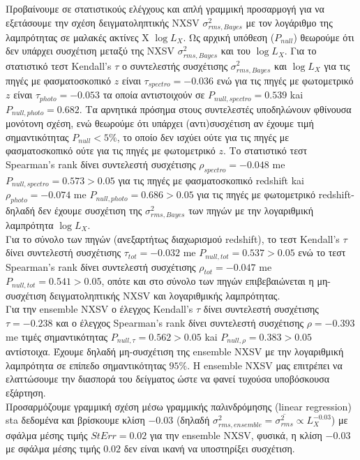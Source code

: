  
Προβαίνουμε σε στατιστικούς ελέγχους και απλή γραμμική προσαρμογή για να εξετάσουμε την σχέση δειγματοληπτικής \textlatin{NXSV} $\sigma_{rms, Bayes}^2$ με τον λογάριθμο της λαμπρότητας σε μαλακές ακτίνες Χ $\log L_X$. Ως αρχική υπόθεση ($P_{null}$) θεωρούμε ότι δεν υπάρχει συσχέτιση μεταξύ της \textlatin{NXSV} $\sigma_{rms, Bayes}^2$ και του $\log L_X$. Για το στατιστικό τεστ \textlatin{Kendall's} $\tau$ ο συντελεστής συσχέτισης $\sigma_{rms, Bayes}^2$ και $\log L_X$ για τις πηγές με φασματοσκοπικό $z$ είναι $\tau_{spectro} = -0.036$ ενώ για τις πηγές με φωτομετρικό $z$ είναι $\tau_{photo} = -0.053$ τα οποία αντιστοιχούν σε $P_{null, spectro} = 0.539$ kai $P_{null, photo} = 0.682$. Τα αρνητικά πρόσημα στους συντελεστές υποδηλώνουν φθίνουσα μονότονη σχέση, ενώ θεωρούμε ότι υπάρχει (αντι)συσχέτιση αν έχουμε τιμή σημαντικότητας $P_{null}<5\%$, το οποίο δεν ισχύει ούτε για τις πηγές με φασματοσκοπικό ούτε για τις πηγές με φωτομετρικό $z$. Το στατιστικό τεστ \textlatin{Spearman's rank} δίνει συντελεστή συσχέτισης $\rho_{spectro} = -0.048$ me $P_{null, spectro} = 0.573> 0.05$ για τις πηγές με φασματοσκοπικό \textlatin{redshift} kai $\rho_{photo} = -0.074$ me $P_{null, photo} = 0.686>0.05$ για τις πηγές με φωτομετρικό \textlatin{redshift}- δηλαδή δεν έχουμε συσχέτιση της $\sigma_{rms, Bayes}^2$ των πηγών με την λογαριθμική λαμπρότητα $\log L_X$. \\
Για το σύνολο των πηγών (ανεξαρτήτως διαχωρισμού \textlatin{redshift}), το τεστ \textlatin{Kendall's} $\tau$ δίνει συντελεστή συσχέτισης $\tau_{tot} = -0.032$ me $P_{null, tot}= 0.537 >0.05$ ενώ το τεστ \textlatin{Spearman's rank} δίνει συντελεστή συσχέτισης $\rho_{tot} =-0.047$ me $P_{null, tot} = 0.541>0.05$, οπότε και στο σύνολο των πηγών επιβεβαιώνεται η μη-συσχέτιση δειγματοληπτικής \textlatin{NXSV} και λογαριθμικής λαμπρότητας.\\
Για την \textlatin{ensemble NXSV} ο έλεγχος \textlatin{Kendall's} $\tau$ δίνει συντελεστή συσχέτισης $\tau = -0.238$ και ο έλεγχος \textlatin{Spearman's rank} δίνει συντελεστή συσχέτισης $\rho= -0.393$ me τιμές σημαντικότητας $P_{null, \tau} =0.562>0.05$ kai $P_{null, \rho} =0.383>0.05$ αντίστοιχα. Έχουμε δηλαδή μη-συσχέτιση της \textlatin{ensemble NXSV} με την λογαριθμική λαμπρότητα σε επίπεδο σημαντικότητας $95\%$. Η \textlatin{ensemble NXSV} μας επιτρέπει να ελαττώσουμε την διασπορά του δείγματος ώστε να φανεί τυχούσα υποβόσκουσα εξάρτηση. \\ 
Προσαρμόζουμε γραμμική σχέση μέσω γραμμικής παλινδρόμησης (\textlatin{linear regression}) sta δεδομένα και βρίσκουμε κλίση $-0.03$ (δηλαδή $\sigma_{rms, ensemble}^2 = \overline{\sigma_{rms}^2} \propto L_X^{-0.03}$) με σφάλμα μέσης τιμής $StErr = 0.02 $ για την \textlatin{ensemble NXSV}, φυσικά, η κλίση $-0.03$ με σφάλμα μέσης τιμής $0.02$ δεν είναι ικανή να υποστηρίξει συσχέτιση. 

